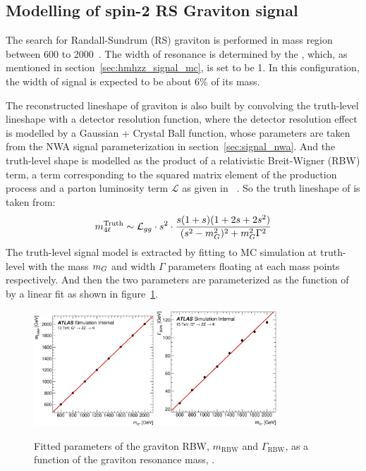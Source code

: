 \subsection{Modelling of spin-2 RS Graviton signal}

The search for Randall-Sundrum (RS) graviton is performed in mass region between 600 to 2000~\gev.
The width of resonance is determined by the \kOverMpl, which, as mentioned in section~\ref{sec:hmhzz_signal_mc}, is set to be 1. 
In this configuration, the width of signal is expected to be about 6\% of its mass.

The reconstructed \mfl lineshape of graviton is also built by convolving the truth-level lineshape with a detector resolution function,
where the detector resolution effect is modelled by a Gaussian + Crystal Ball function, whose parameters are taken from the NWA signal parameterization in section~\ref{sec:signal_nwa}.
And the truth-level shape is modelled as the product of a relativistic Breit-Wigner (RBW) term, a term corresponding to the squared matrix element of the production process and a parton luminosity term $\mathcal{L}$ as given in ~\cite{Bijnens_2001}.
So the truth lineshape of \mfl is taken from:
\begin{equation*}
        m_{4\ell}^{\text{Truth}} \sim \mathcal{L}_{gg} \cdot s^2 \cdot \frac{s(1 + s)(1 + 2s + 2s^2)}{(s^2 - m_{G}^2)^2 + m_{G}^2 \Gamma^2}
\end{equation*}
The truth-level signal model is extracted by fitting to MC simulation at truth-level with the mass $m_{G}$ and width $\Gamma$ parameters floating at each mass points respectively.
And then the two parameters are parameterized as the function of \mH by a linear fit as shown in figure~\ref{fig:graviton_truth_param_vs_mG}.
\begin{figure}[htbp]
        \centering
        \includegraphics[width=0.4\textwidth]{figures/HMHZZ/signal/RSGraviton/graviton_param_m_RBW.eps}
        \includegraphics[width=0.4\textwidth]{figures/HMHZZ/signal/RSGraviton/graviton_param_G_RBW.eps}
        \caption{Fitted parameters of the graviton RBW, $m_{\text{RBW}}$ and $\Gamma_{\text{RBW}}$, as a function of the
        graviton resonance mass, \mG.}
        \label{fig:graviton_truth_param_vs_mG}
\end{figure}

